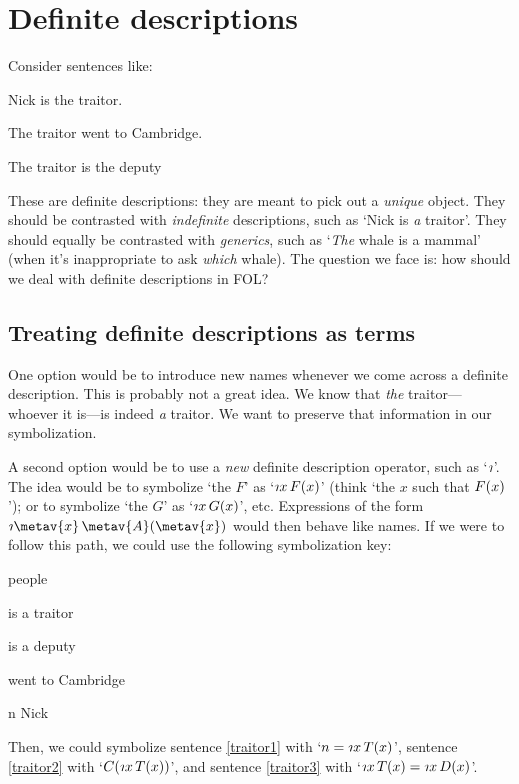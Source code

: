 \chapter{Definite descriptions}\label{subsec.defdesc}
Consider sentences like:
	\begin{earg}
		\item[\ex{traitor1}] Nick is the traitor.
		\item[\ex{traitor2}] The traitor went to Cambridge.
		\item[\ex{traitor3}] The traitor is the deputy 
	\end{earg}
These are definite descriptions: they are meant to pick out a \emph{unique} object. They should be contrasted with \emph{indefinite} descriptions, such as `Nick  is \emph{a} traitor'. They should equally be contrasted with \emph{generics}, such as `\emph{The} whale is a mammal' (when it's inappropriate to ask \emph{which} whale). The question we face is: how should we deal with definite descriptions in FOL?


\section{Treating definite descriptions as terms}
One option would be to introduce new names whenever we come across a definite description. This is probably not a great idea. We know that \emph{the} traitor---whoever it is---is indeed \emph{a} traitor. We want to preserve that information in our symbolization.

A second option would be to use a \emph{new} definite description operator, such as `$\maththe$'. The idea would be to symbolize `the $F$' as `$\maththe x\,\atom{F}{x}$'  (think `the $x$ such that $\mathord{F}(x)$'); or to symbolize `the $G$' as `$\maththe x\,\atom{G}{x}$', etc. Expressions of the form $\maththe \metav{x}\, \atom{\metav{A}}{\metav{x}}$ would then behave like names. If we were to follow this path, we could use the following symbolization key:
	\begin{ekey}
		\item[\text{domain}] people
		\item[\atom{T}{x}]  is a traitor
		\item[\atom{D}{x}]  is a deputy
		\item[\atom{C}{x}]  went to Cambridge
		\item[n] Nick
	\end{ekey}
Then, we could symbolize sentence \ref{traitor1} with `$n = \maththe x\, \atom{T}{x}$', sentence \ref{traitor2} with `$\atom{C}{\maththe x\,\atom{T}{x}}$', and sentence \ref{traitor3} with `$\maththe x\, \atom{T}{x} = \maththe x\, \atom{D}{x}$'. 

